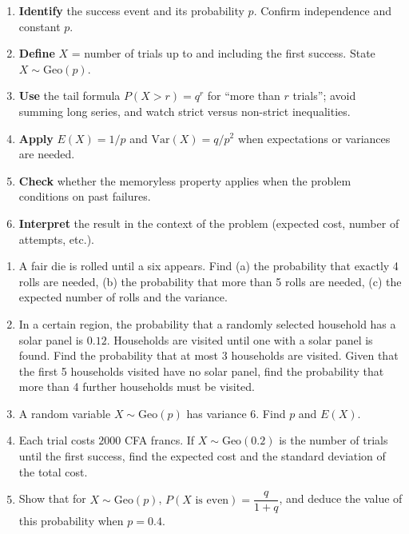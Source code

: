 \documentclass[11pt]{article}
\begin{document}
\begin{methode}
\begin{enumerate}
\item \textbf{Identify} the success event and its probability $p$. Confirm independence and constant $p$.
\item \textbf{Define} $X$ = number of trials up to and including the first success. State $X\sim\mathrm{Geo}(p)$.
\item \textbf{Use} the tail formula $P(X>r)=q^r$ for ``more than $r$ trials''; avoid summing long series, and watch strict versus non-strict inequalities.
\item \textbf{Apply} $E(X)=1/p$ and $\mathrm{Var}(X)=q/p^2$ when expectations or variances are needed.
\item \textbf{Check} whether the memoryless property applies when the problem conditions on past failures.
\item \textbf{Interpret} the result in the context of the problem (expected cost, number of attempts, etc.).
\end{enumerate}
\end{methode}

\begin{exercice}
\begin{enumerate}
\item A fair die is rolled until a six appears. Find (a) the probability that exactly 4 rolls are needed, (b) the probability that more than 5 rolls are needed, (c) the expected number of rolls and the variance.
\item In a certain region, the probability that a randomly selected household has a solar panel is $0.12$. Households are visited until one with a solar panel is found. Find the probability that at most 3 households are visited. Given that the first 5 households visited have no solar panel, find the probability that more than 4 further households must be visited.
\item A random variable $X\sim\mathrm{Geo}(p)$ has variance $6$. Find $p$ and $E(X)$.
\item Each trial costs $2000$ CFA francs. If $X\sim\mathrm{Geo}(0.2)$ is the number of trials until the first success, find the expected cost and the standard deviation of the total cost.
\item Show that for $X\sim\mathrm{Geo}(p)$, $P(X \text{ is even}) = \dfrac{q}{1+q}$, and deduce the value of this probability when $p = 0.4$.
\end{enumerate}
\end{exercice}
\end{document}
